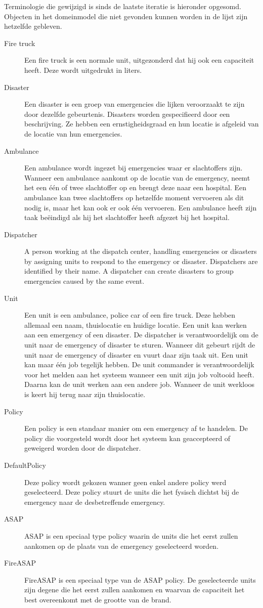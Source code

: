 \label{terminologie}
Terminologie die gewijzigd is sinds de laatste iteratie is hieronder opgesomd. Objecten in het domeinmodel die niet gevonden kunnen worden in de lijst zijn hetzelfde gebleven. 
\begin{description}
  \item[Fire truck] Een fire truck is een normale unit, uitgezonderd dat hij ook een capaciteit heeft. Deze wordt uitgedrukt in liters.
  \item[Disaster] Een disaster is een groep van emergencies die lijken veroorzaakt te zijn door dezelfde gebeurtenis. Disasters worden gespecifieerd door een beschrijving. Ze hebben een ernstigheidsgraad en hun locatie is afgeleid van de locatie van hun emergencies.
    \item[Ambulance] Een ambulance wordt ingezet bij emergencies waar er slachtoffers zijn. Wanneer een ambulance aankomt op de locatie van de emergency, neemt het een \'e\'en of twee slachtoffer op en brengt deze naar een hospital. Een ambulance kan twee slachtoffers op hetzelfde moment vervoeren als dit nodig is, maar het kan ook er ook \'e\'en vervoeren. Een ambulance heeft zijn taak be\"eindigd als hij het slachtoffer heeft afgezet bij het hospital.
      \item[Dispatcher] A person working at the dispatch center, handling emergencies or disasters by assigning units to respond to the emergency or disaster. Dispatchers are identified by their name. A dispatcher can create disasters to group emergencies caused by the same event.
  \item[Unit] Een unit is een ambulance, police car of een fire truck. Deze hebben allemaal een naam, thuislocatie en huidige locatie. Een unit kan werken aan een emergency of een disaster. De dispatcher is verantwoordelijk om de unit naar de emergency of disaster te sturen. Wanneer dit gebeurt rijdt de unit naar de emergency of disaster en vuurt daar zijn taak uit. Een unit kan maar \'e\'en job tegelijk hebben. De unit commander is verantwoordelijk voor het melden aan het systeem wanneer een unit zijn job voltooid heeft. Daarna kan de unit werken aan een andere job. Wanneer de unit werkloos is keert hij terug naar zijn thuislocatie.
  \item[Policy]  Een policy is een standaar manier om een emergency af te handelen. De policy die voorgesteld wordt door het systeem kan geaccepteerd of geweigerd worden door de dispatcher.
  \item[DefaultPolicy] Deze policy wordt gekozen wanner geen enkel andere policy werd geselecteerd. Deze policy stuurt de units die het fysisch dichtst bij de emergency naar de desbetreffende emergency.
  \item[ASAP] ASAP is een speciaal type policy waarin de units die het eerst zullen aankomen op de plaats van de emergency geselecteerd worden.
  \item[FireASAP] FireASAP is een speciaal type van de ASAP policy. De geselecteerde units zijn degene die het eerst zullen aankomen en waarvan de capaciteit het best overeenkomt met de grootte van de brand.
\end{description}
